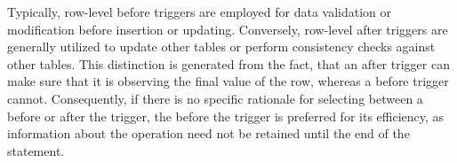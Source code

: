 



Typically, row-level before triggers are employed for data validation or modification before insertion or updating. Conversely, row-level after triggers are generally utilized to update other tables or perform consistency checks against other tables. This distinction is generated from the fact, that an after trigger can make sure that it is observing the final value of the row, whereas a before trigger cannot. Consequently, if there is no specific rationale for selecting between a before or after the trigger, the before the trigger is preferred for its efficiency, as information about the operation need not be retained until the end of the statement.


